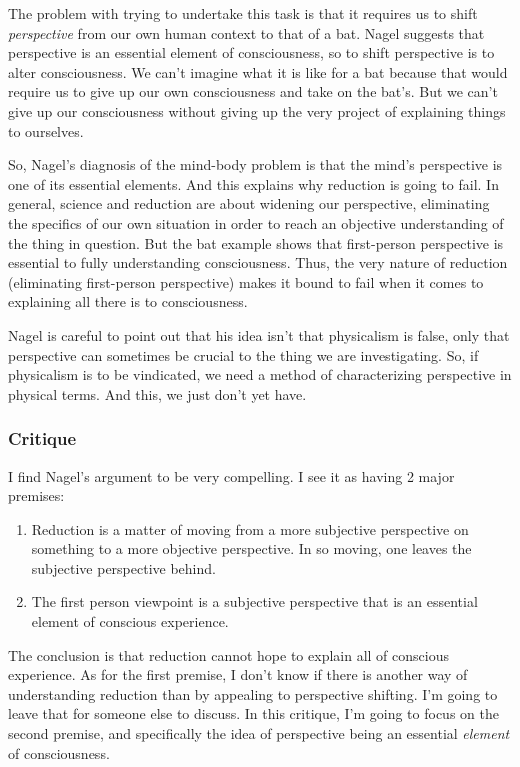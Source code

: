 \documentclass{article}
\begin{document}
The problem with trying to undertake this task is that it requires us to
shift \emph{perspective} from our own human context to that of a bat.
Nagel suggests that perspective is an essential element of
consciousness, so to shift perspective is to alter consciousness. We
can't imagine what it is like for a bat because that would require us to
give up our own consciousness and take on the bat's. But we can't give
up our consciousness without giving up the very project of explaining
things to ourselves.

So, Nagel's diagnosis of the mind-body problem is that the mind's
perspective is one of its essential elements. And this explains why
reduction is going to fail. In general, science and reduction are about
widening our perspective, eliminating the specifics of our own situation
in order to reach an objective understanding of the thing in question.
But the bat example shows that first-person perspective is essential to
fully understanding consciousness. Thus, the very nature of reduction
(eliminating first-person perspective) makes it bound to fail when it
comes to explaining all there is to consciousness.

Nagel is careful to point out that his idea isn't that physicalism is
false, only that perspective can sometimes be crucial to the thing we
are investigating. So, if physicalism is to be vindicated, we need a
method of characterizing perspective in physical terms. And this, we
just don't yet have.

\subsubsection*{Critique}

I find Nagel's argument to be very compelling. I see it as having 2
major premises:

\begin{enumerate}
\itemsep1pt\parskip0pt
\item
  Reduction is a matter of moving from a more subjective perspective on
  something to a more objective perspective. In so moving, one leaves
  the subjective perspective behind.
\item
  The first person viewpoint is a subjective perspective that is an
  essential element of conscious experience.
\end{enumerate}

The conclusion is that reduction cannot hope to explain all of conscious
experience. As for the first premise, I don't know if there is another
way of understanding reduction than by appealing to perspective
shifting. I'm going to leave that for someone else to discuss. In this
critique, I'm going to focus on the second premise, and specifically the
idea of perspective being an essential \emph{element} of consciousness.
\end{document}
